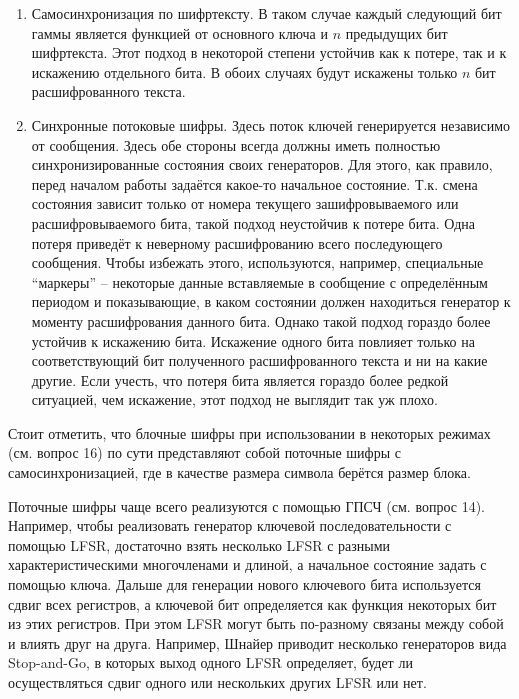 \begin{enumerate}
	\item Самосинхронизация по шифртексту. В таком случае каждый следующий бит гаммы является функцией от основного ключа и $n$ предыдущих бит шифртекста. Этот подход в некоторой степени устойчив как к потере, так и к искажению отдельного бита. В обоих случаях будут искажены только $n$ бит расшифрованного текста.
	
	\item  Синхронные потоковые шифры. Здесь поток ключей генерируется независимо от сообщения. Здесь обе стороны всегда должны иметь полностью синхронизированные состояния своих генераторов. Для этого, как правило, перед началом работы задаётся какое-то начальное состояние. Т.к. смена состояния зависит только от номера текущего зашифровываемого или расшифровываемого бита, такой подход неустойчив к потере бита. Одна потеря приведёт к неверному расшифрованию всего последующего сообщения. Чтобы избежать этого, используются, например, специальные “маркеры” -- некоторые данные вставляемые в сообщение с определённым периодом и показывающие, в каком состоянии должен находиться генератор к моменту расшифрования данного бита. Однако такой подход гораздо более устойчив к искажению бита. Искажение одного бита повлияет только на соответствующий бит полученного расшифрованного текста и ни на какие другие. Если учесть, что потеря бита является гораздо более редкой ситуацией, чем искажение, этот подход не выглядит так уж плохо. 
\end{enumerate}

Стоит отметить, что блочные шифры при использовании в некоторых режимах (см. вопрос 16) по сути представляют собой поточные шифры с самосинхронизацией, где в качестве размера символа берётся размер блока.

Поточные шифры чаще всего реализуются с помощью ГПСЧ (см. вопрос 14). Например, чтобы реализовать генератор ключевой последовательности с помощью LFSR, достаточно взять несколько LFSR с разными характеристическими многочленами и длиной, а начальное состояние задать с помощью ключа. Дальше для генерации нового ключевого бита используется сдвиг всех регистров, а ключевой бит определяется как функция некоторых бит из этих регистров. При этом LFSR могут быть по-разному связаны между собой и влиять друг на друга. Например, Шнайер приводит несколько генераторов вида Stop-and-Go, в которых выход одного LFSR определяет, будет ли осуществляться сдвиг одного или нескольких других LFSR или нет. 